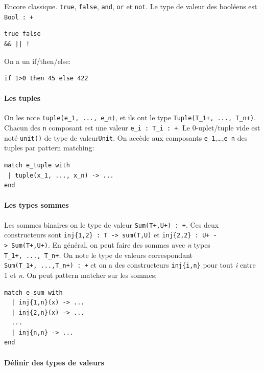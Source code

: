 \documentclass[12pt]{article}
\begin{document}
Encore classique. \texttt{true}, \texttt{false}, \texttt{and},
\texttt{or} et \texttt{not}. Le type de valeur des booléens est
\texttt{Bool\ :\ +}

\begin{verbatim}
true false 
&& || ! 
\end{verbatim}

On a un if/then/else:

\begin{verbatim}
if 1>0 then 45 else 422 
\end{verbatim}

\hypertarget{les-tuples}{%
      \paragraph*{Les tuples}\label{les-tuples}}

On les note \texttt{tuple(e\_1,\ ...,\ e\_n)}, et ils ont le type
\texttt{Tuple(T\_1+,\ ...,\ T\_n+)}. Chacun des \texttt{n} composant est
une valeur \texttt{e\_i\ :\ T\_i\ :\ +}. Le 0-uplet/tuple vide est noté
\texttt{unit()} de type de valeur\texttt{Unit}. On accède aux composants
\texttt{e\_1},\ldots,\texttt{e\_n} des tuples par pattern matching:

\begin{verbatim}
match e_tuple with
 | tuple(x_1, ..., x_n) -> ... 
end
\end{verbatim}

\hypertarget{les-types-sommes}{%
      \paragraph*{Les types sommes}\label{les-types-sommes}}

Les sommes binaires on le type de valeur \texttt{Sum(T+,U+)\ :\ +}. Ces
deux constructeurs sont
\texttt{inj\{1,2\}\ :\ T\ -\textgreater{}\ sum(T,U)} et
\texttt{inj\{2,2\}\ :\ U+\ -\textgreater{}\ Sum(T+,U+)}. En général, on
peut faire des sommes avec \emph{n} types \texttt{T\_1+,\ ...,\ T\_n+}.
On note le type de valeurs correspondant
\texttt{Sum(T\_1+,\ ...,T\_n+)\ :\ +} et on a des constructeurs
\texttt{inj\{i,n\}} pour tout \emph{i} entre 1 et \emph{n}. On peut
pattern matcher sur les sommes:

\begin{verbatim}
match e_sum with
  | inj{1,n}(x) -> ...
  | inj{2,n}(x) -> ...
  ...
  | inj{n,n} -> ...
end
\end{verbatim}

\hypertarget{duxe9finir-des-types-de-valeurs}{%
      \paragraph*{Définir des types de
            valeurs}\label{duxe9finir-des-types-de-valeurs}}
\end{document}
